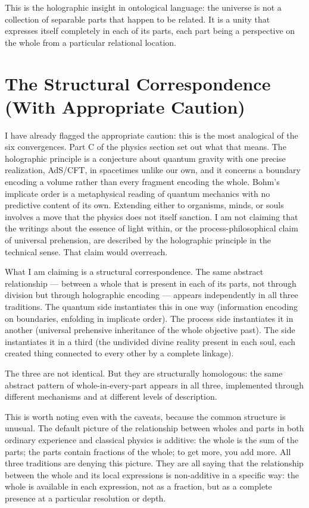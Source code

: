 This is the holographic insight in ontological language: the universe is not a collection of separable parts that happen to be related.
It is a unity that expresses itself completely in each of its parts, each part being a perspective on the whole from a particular relational location.

\section{The Structural Correspondence (With Appropriate Caution)}
\label{sec:ch11-convergence}

I have already flagged the appropriate caution: this is the most analogical of the six convergences.
Part C of the physics section set out what that means.
The holographic principle is a conjecture about quantum gravity with one precise realization, AdS/CFT, in spacetimes unlike our own, and it concerns a boundary encoding a volume rather than every fragment encoding the whole.
Bohm's implicate order is a metaphysical reading of quantum mechanics with no predictive content of its own.
Extending either to organisms, minds, or souls involves a move that the physics does not itself sanction.
I am not claiming that the \bahai writings about the essence of light within, or the process-philosophical claim of universal prehension, are described by the holographic principle in the technical sense.
That claim would overreach.

What I am claiming is a structural correspondence.
The same abstract relationship --- between a whole that is present in each of its parts, not through division but through holographic encoding --- appears independently in all three traditions.
The quantum side instantiates this in one way (information encoding on boundaries, enfolding in implicate order).
The process side instantiates it in another (universal prehensive inheritance of the whole objective past).
The \bahai side instantiates it in a third (the undivided divine reality present in each soul, each created thing connected to every other by a complete linkage).

The three are not identical.
But they are structurally homologous: the same abstract pattern of whole-in-every-part appears in all three, implemented through different mechanisms and at different levels of description.

This is worth noting even with the caveats, because the common structure is unusual.
The default picture of the relationship between wholes and parts in both ordinary experience and classical physics is additive: the whole is the sum of the parts; the parts contain fractions of the whole; to get more, you add more.
All three traditions are denying this picture.
They are all saying that the relationship between the whole and its local expressions is non-additive in a specific way: the whole is available in each expression, not as a fraction, but as a complete presence at a particular resolution or depth.

